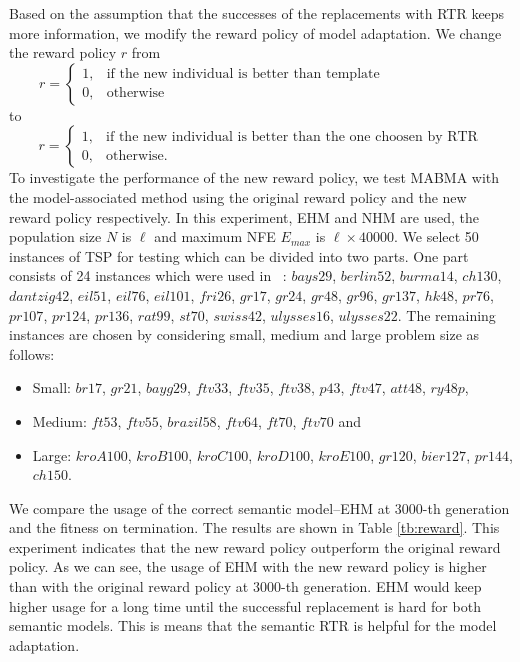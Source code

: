 Based on the assumption that the successes of the replacements with RTR keeps more information, we modify the reward policy of model adaptation. We change the reward policy $r$ from \[r=
\begin{cases}
1,  & \mbox{if the new individual is better than template~~~~~~~~~~~~~~~~~~~~ }\\
0, & \mbox{otherwise}
\end{cases}
\]to\[r=
\begin{cases}
1,  & \mbox{if the new individual is better than the one choosen by RTR}\\
0, & \mbox{otherwise.}
\end{cases}
\]
To investigate the performance of the new reward policy, we test MABMA with the model-associated method using the original reward policy and the new reward policy respectively. In this experiment, EHM and NHM are used, the population size $N$ is $\ell$ and maximum NFE $E_{max}$ is $\ell\times 40000$. We select 50 instances of TSP for testing which can be divided into two parts. One part consists of 24 instances which were used in~\cite{ceberio2012review} : $bays29$, $berlin52$, $burma14$, $ch130$, $dantzig42$, $eil51$, $eil76$, $eil101$, $fri26$, $gr17$, $gr24$, $gr48$, $gr96$, $gr137$, $hk48$, $pr76$, $pr107$, $pr124$, $pr136$, $rat99$, $st70$, $swiss42$, $ulysses16$, $ulysses22$. The remaining instances are chosen by considering small, medium and large problem size as follows:
\begin{itemize}
    \item Small: $br17$, $gr21$, $bayg29$, $ftv33$, $ftv35$, $ftv38$, $p43$, $ftv47$, $att48$, $ry48p$,
    \item Medium: $ft53$, $ftv55$, $brazil58$, $ftv64$, $ft70$, $ftv70$ and
    \item Large: $kroA100$,	$kroB100$,	$kroC100$,	$kroD100$,	$kroE100$,	$gr120$,	$bier127$,	$pr144$,	$ch150$.
\end{itemize}
We compare the usage of the correct semantic model--EHM at $3000$-th generation and the fitness on termination. The results are shown in Table \ref{tb:reward}. This experiment indicates that the new reward policy outperform the original reward policy. As we can see, the usage of EHM with the new reward policy is higher than with the original reward policy at $3000$-th generation. EHM would keep higher usage for a long time until the successful replacement is hard for both semantic models. This is means that the semantic RTR is helpful for the model adaptation.

